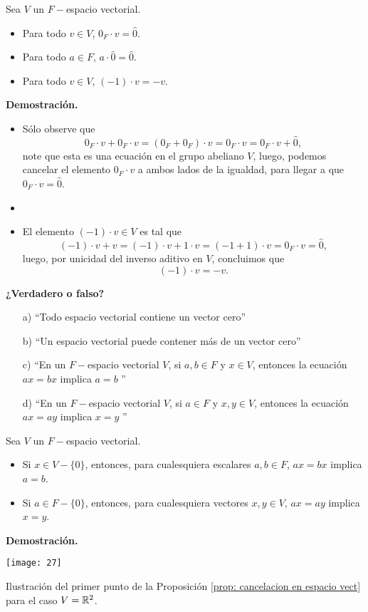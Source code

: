 \begin{prop}
		\label{prop: hechos basicos ev}
	Sea $V$ un $F-$espacio vectorial.
	\begin{itemize}
		\item Para todo $v\in V$, $0_{F} \cdot v = \hat{0}$.
		\item Para todo $a \in F$, $a \cdot \hat{0} = \hat{0}$.
		\item Para todo $v \in V$, $(-1) \cdot v = - v$.
	\end{itemize}
\end{prop}
\textbf{Demostración.}
\begin{itemize}
	\item Sólo observe que 
	\[
	0_{F}  \cdot v + 0_{F} \cdot v = (0_{F} + 0_{F}) \cdot v = 0_{F}\cdot v
	= 0_{F} \cdot v + \hat{0},
	\]
	note que esta es una ecuación en el grupo abeliano $V$, luego, podemos 
	cancelar el elemento $0_{F} \cdot v$ a ambos lados de la igualdad, para
	llegar a que $0_{F} \cdot v = \hat{0}$.
	\item {}
	\item El elemento $(-1) \cdot v \in V$ es tal que 
	\[
	(-1) \cdot v + v = (-1) \cdot v + 1 \cdot v = (-1+1) \cdot v
	= 0_{F} \cdot v = \hat{0},
	\]
	luego, por unicidad del inverso aditivo en $V$, concluimos que 
	\[
	(-1) \cdot v = -v.
	\]
\end{itemize}

\QEDB
\vspace{0.2cm}

\textbf{¿Verdadero o falso?} 
\begin{itemize}
	\item[a)] ``Todo espacio vectorial contiene un vector cero''
	\item[b)] ``Un espacio vectorial puede contener más de un vector cero''
	\item[c)] ``En un $F-$espacio vectorial $V$, si $a, b \in F$ y $x \in V$, entonces 
	la ecuación $a x = b x $ implica $a = b$ ''
	\item[d)]  ``En un $F-$espacio vectorial $V$, si $a \in F$ y $x, y \in V$, entonces 
	la ecuación $a x = a y $ implica $x = y$ ''
\end{itemize}


\begin{prop}
		\label{prop: cancelacion en espacio vect}
	Sea $V$ un $F-$espacio vectorial. 
	\begin{itemize}
		\item Si $x \in V - \{0 \}$, entonces, para cualesquiera escalares
		$a, b \in F$, $ax = bx$ implica $a = b$.
		\item Si $a \in F - \{ 0 \}$, entonces, para cualesquiera vectores
		$x, y \in V$, $ax = ay$ implica $x = y$.
	\end{itemize}
\end{prop}
\textbf{Demostración.}
\begin{marginfigure}
	\texttt{[image: 27]} 
	\caption{Ilustración del primer punto de la Proposición
	\ref{prop: cancelacion en espacio vect} para el caso $V = \mathbb{R}^{2}$.}
\end{marginfigure}

